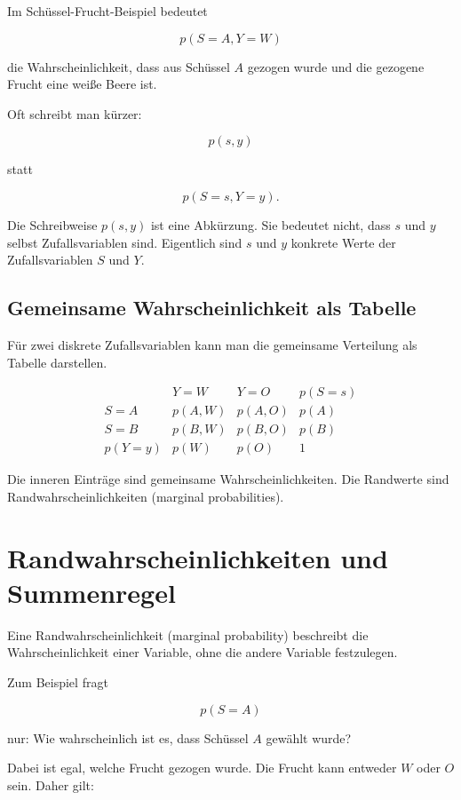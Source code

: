 Im Schüssel-Frucht-Beispiel bedeutet

\[
    p(S=A,Y=W)
\]

die Wahrscheinlichkeit, dass aus Schüssel \(A\) gezogen wurde und die gezogene Frucht eine weiße Beere ist.

Oft schreibt man kürzer:

\[
    p(s,y)
\]

statt

\[
    p(S=s,Y=y).
\]

\begin{notebox}
Die Schreibweise \(p(s,y)\) ist eine Abkürzung.
Sie bedeutet nicht, dass \(s\) und \(y\) selbst Zufallsvariablen sind.
Eigentlich sind \(s\) und \(y\) konkrete Werte der Zufallsvariablen \(S\) und \(Y\).
\end{notebox}

\subsection{Gemeinsame Wahrscheinlichkeit als Tabelle}

Für zwei diskrete Zufallsvariablen kann man die gemeinsame Verteilung als Tabelle darstellen.

\[
\begin{array}{c|cc|c}
    & Y=W & Y=O & p(S=s) \\
    \hline
    S=A & p(A,W) & p(A,O) & p(A) \\
    S=B & p(B,W) & p(B,O) & p(B) \\
    \hline
    p(Y=y) & p(W) & p(O) & 1
\end{array}
\]

Die inneren Einträge sind gemeinsame Wahrscheinlichkeiten.
Die Randwerte sind Randwahrscheinlichkeiten (marginal probabilities).

\section{Randwahrscheinlichkeiten und Summenregel}

Eine Randwahrscheinlichkeit (marginal probability) beschreibt die Wahrscheinlichkeit einer Variable, ohne die andere Variable festzulegen.

Zum Beispiel fragt

\[
    p(S=A)
\]

nur:
Wie wahrscheinlich ist es, dass Schüssel \(A\) gewählt wurde?

Dabei ist egal, welche Frucht gezogen wurde.
Die Frucht kann entweder \(W\) oder \(O\) sein.
Daher gilt:


